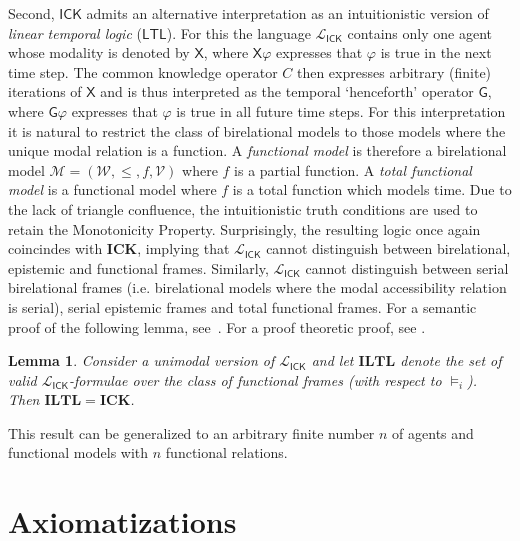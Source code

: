 \documentclass{myifcolog}
\newcommand\C {C}
\newcommand\X {\mathbin{\mathsf{X}}}
\newcommand\G {\mathbin{\mathsf{G}}}
\newcommand{\ICK}{\mathsf{ICK}}
\newcommand{\LICK}{\mathcal{L}_{\ICK}}
\newcommand{\fw}{\mathcal{M}}
\newcommand{\W}{\mathcal{W}}
\newcommand{\V}{\mathcal{V}}
\newtheorem{lemma}[theorem]{Lemma}
\numberwithin{theorem}{section}
\begin{document}
Second, $\ICK$ admits an alternative interpretation as an intuitionistic version of \emph{linear temporal logic} ($\mathsf{LTL}$). For this the language $\LICK$ contains only one agent whose modality is denoted by $\X$, where $\X \varphi$ expresses that $\varphi$ is true in the next time step. The common knowledge operator $\C$ then expresses arbitrary (finite) iterations of $\X$ and is thus interpreted as the temporal `henceforth' operator $\G$, where $\G \varphi$ expresses that $\varphi$ is true in all future time steps. For this interpretation it is natural to restrict the class of birelational models to those models where the unique modal relation is a function. A \emph{functional model} is therefore a birelational model $\fw = (\W, \leq, f, \V)$ where $f$ is a partial function. A \emph{total functional model} is a functional model where $f$ is a total function which models time. Due to the lack of triangle confluence, the intuitionistic truth conditions are used to retain the Monotonicity Property. Surprisingly, the resulting logic once again coincindes with $\mathbf{ICK}$, implying that $\LICK$ cannot distinguish between birelational, epistemic and functional frames. Similarly, $\LICK$ cannot distinguish between serial birelational frames (i.e. birelational models where the modal accessibility relation is serial), serial epistemic frames and total functional frames. For a semantic proof of the following lemma, see~\cite[Theorem 3.21]{Zenger_2025}. For a proof theoretic proof, see {\cite[Theorem 5.15]{afshari_intuitionistic_2024}}.

\begin{lemma}\label{l: functional and triangle frames}
    Consider a unimodal version of $\LICK$ and let $\mathbf{ILTL}$ denote the set of valid $\LICK$-formulae over the class of functional frames (with respect to $\models_i$). Then $\mathbf{ILTL} = \mathbf{ICK}$.
\end{lemma}

This result can be generalized to an arbitrary finite number $n$ of agents and functional models with $n$ functional relations.



\section{Axiomatizations}\label{s: axiomatization}
\end{document}
